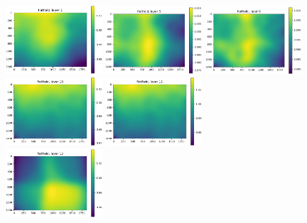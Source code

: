 \documentclass[letterpaper,11pt]{article}
\begin{document}
\begin{figure}[!ht]
\centering
\includegraphics[width=0.32\textwidth]{images/results/flatfield_layers_polaris/flatfield_layer_1}
\includegraphics[width=0.32\textwidth]{images/results/flatfield_layers_polaris/flatfield_layer_5}
\includegraphics[width=0.32\textwidth]{images/results/flatfield_layers_polaris/flatfield_layer_9}
\includegraphics[width=0.32\textwidth]{images/results/flatfield_layers_polaris/flatfield_layer_10}
\includegraphics[width=0.32\textwidth]{images/results/flatfield_layers_polaris/flatfield_layer_11} \\
\includegraphics[width=0.32\textwidth]{images/results/flatfield_layers_polaris/flatfield_layer_12}

\end{figure}
\end{document}
